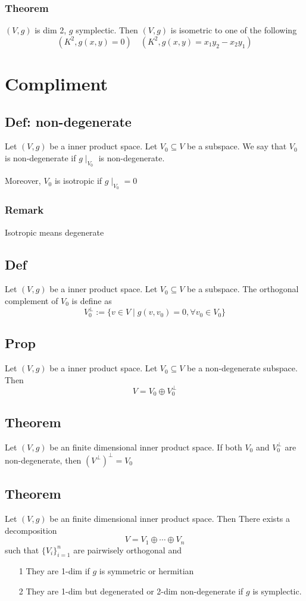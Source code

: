 \documentclass{book}
\begin{document}
\subsection{Theorem}
$(V,g)$ is dim 2, $g$ symplectic. Then $(V,g)$ is isometric to one of the following
$$(K^2,g(x,y)=0)\quad(K^2,g(x,y)=x_1y_2-x_2y_1)$$
\chapter{Compliment}
\section{Def: non-degenerate}
Let $(V,g)$ be a inner product space. Let $V_0\subseteq V$ be a subspace. We say that $V_0$ is non-degenerate if $g\mid_{V_0}$ is non-degenerate.

Moreover, $V_0$ is isotropic if $g\mid_{V_0}=0$
\subsection*{Remark}Isotropic means degenerate
\section{Def}
Let $(V,g)$ be a inner product space. Let $V_0\subseteq V$ be a subspace. The orthogonal complement of $V_0$ is define as
$$V_0^\bot:=\{v\in V\mid g(v,v_0)=0,\forall v_0\in V_0\}$$
\section{Prop}
Let $(V,g)$ be a inner product space. Let $V_0\subseteq V$ be a non-degenerate subspace. Then$$V=V_0\oplus V_0^\bot$$
\section{Theorem}
Let $(V,g)$ be an finite dimensional inner product space. If both $V_0$ and $V_0^\bot$ are non-degenerate, then $(V^\bot)^\bot=V_0$
\section{Theorem}
\label{theorem 58.5}
Let $(V,g)$ be an finite dimensional inner product space. Then There exists a decomposition$$V=V_1\oplus\cdots\oplus V_n$$
such that $\{V_i\}_{i=1}^n$ are pairwisely orthogonal and \begin{itemize}
    \item [1] They are 1-dim if $g$ is symmetric or hermitian
    \item [2]They are 1-dim but degenerated or 2-dim non-degenerate if $g$ is symplectic.
\end{itemize}
\end{document}
